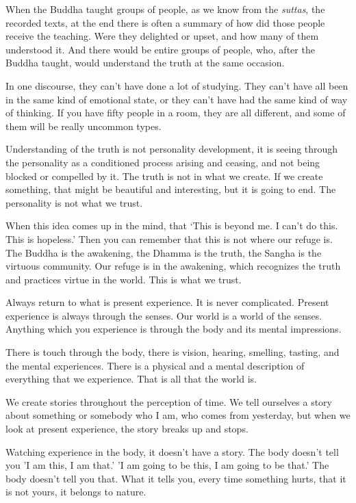 When the Buddha taught groups of people, as we know from the
\emph{suttas}, the recorded texts, at the end there is often a summary
of how did those people receive the teaching. Were they delighted or
upset, and how many of them understood it. And there would be entire
groups of people, who, after the Buddha taught, would understand the
truth at the same occasion.

In one discourse, they can't have done a lot of studying. They can't
have all been in the same kind of emotional state, or they can't have
had the same kind of way of thinking. If you have fifty people in a
room, they are all different, and some of them will be really uncommon
types.

Understanding of the truth is not personality development, it is seeing
through the personality as a conditioned process arising and ceasing,
and not being blocked or compelled by it. The truth is not in what we
create. If we create something, that might be beautiful and interesting,
but it is going to end. The personality is not what we trust.

When this idea comes up in the mind, that `This is beyond me. I can't do
this. This is hopeless.' Then you can remember that this is not where
our refuge is. The Buddha is the awakening, the Dhamma is the truth, the
Sangha is the virtuous community. Our refuge is in the awakening, which
recognizes the truth and practices virtue in the world. This is what we
trust.

Always return to what is present experience. It is never complicated.
Present experience is always through the senses. Our world is a world of
the senses. Anything which you experience is through the body and its
mental impressions.

There is touch through the body, there is vision, hearing, smelling,
tasting, and the mental experiences. There is a physical and a mental
description of everything that we experience. That is all that the world
is.

We create stories throughout the perception of time. We tell ourselves a
story about something or somebody who I am, who comes from yesterday,
but when we look at present experience, the story breaks up and stops.

Watching experience in the body, it doesn't have a story. The body
doesn't tell you 'I am this, I am that.' 'I am going to be this, I am
going to be that.' The body doesn't tell you that. What it tells you,
every time something hurts, that it is not yours, it belongs to nature.


